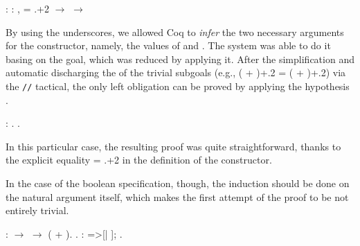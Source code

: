 \coqdoceol
\coqdocemptyline
\coqdocnoindent
{}\coqdoceol
\coqdocindent{2.50em}
: \coqdockw{\ensuremath{\forall}}   : ,  = .+2 \ensuremath{\rightarrow}   \ensuremath{\rightarrow}  

\coqdocemptyline


By using the underscores, we allowed Coq to \textit{infer} the two necessary
arguments for the  constructor, namely, the values of  and
. The system was able to do it basing on the goal, which was
reduced by applying it. After the simplification and automatic
discharging the of the trivial subgoals (e.g., ( + )+.2 = ( +
)+.2) via the \texttt{//} tactical, the only left obligation can
be proved by applying the hypothesis .


\begin{coqdoccode}
\coqdocemptyline
\coqdocnoindent
{} : .\coqdoceol
\coqdocemptyline
\coqdocnoindent
{}.\coqdoceol
\coqdocemptyline
\end{coqdoccode}


In this particular case, the resulting proof was quite
straightforward, thanks to the explicit equality  = .+2 in the
definition of the  constructor.


In the case of the boolean specification, though, the induction should
be done on the natural argument itself, which makes the first attempt
of the proof to be not entirely trivial.


\begin{coqdoccode}
\coqdocemptyline
\coqdocnoindent
{}    :   \ensuremath{\rightarrow}   \ensuremath{\rightarrow}  ( + ).\coqdoceol
\coqdocnoindent
{}.\coqdoceol
\coqdocnoindent
{}: =>[| ];    .\coqdoceol
\coqdocemptyline
\end{coqdoccode}


\label{pg:evenbplus}


